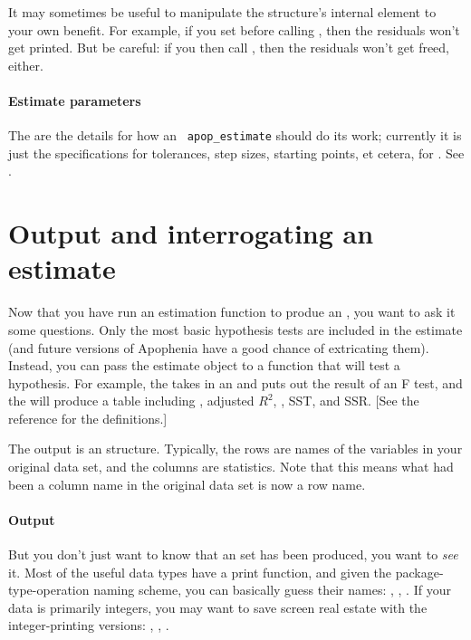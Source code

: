 It may sometimes be useful to manipulate the  structure's
internal  element to your own benefit. For
example, if you set  before calling
, then the residuals won't get
printed. But be careful: if you then call ,
then the residuals won't get freed, either.

\paragraph{Estimate parameters}
The  are the details for how an {\tt
apop\_estimate} should do its work; currently it is just the specifications
for tolerances, step sizes, starting points, et cetera, for .
 See .

\section{Output and interrogating an estimate}
Now that you have run an estimation function to produe an 
, you want to ask it some questions. Only the most
basic hypothesis tests are included in the estimate (and future versions
of Apophenia have a good chance of extricating them). Instead, you can
pass the estimate object to a function that will test a hypothesis. For
example, the  takes in an 
 and puts out the result of an F test, and the
 will produce a
table including , adjusted $R^2$, , SST, and SSR. [See the
reference for the definitions.]

The output is an  structure. Typically, the rows are
names of the variables in your original data set, and the columns are
statistics. Note that this means what had been a column name in the 
original data set is now a row name.

\paragraph{Output} 
But you don't just want to know that an  set has been
produced, you want to {\sl see} it.  Most of the useful data types have
a print function, and given the package-type-operation naming scheme,
you can basically guess their names: ,
, . If your
data is primarily integers, you may want to save screen real estate
with the integer-printing versions: ,
, .

